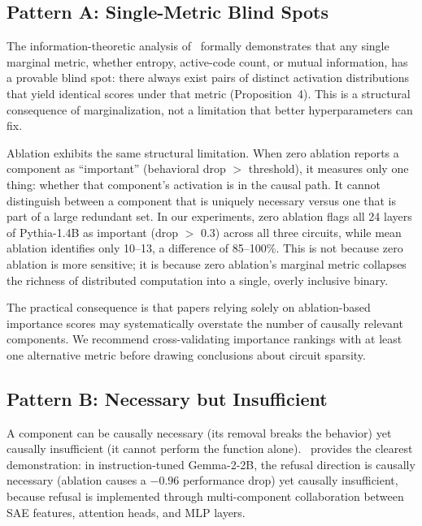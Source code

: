 \documentclass[pdflatex,sn-mathphys-num]{sn-jnl}
\begin{document}
\subsection{Pattern A: Single-Metric Blind Spots}
\label{sec:patternA}

The information-theoretic analysis of~\cite{Hayashi2026} formally demonstrates that any single marginal metric, whether entropy, active-code count, or mutual information, has a provable blind spot: there always exist pairs of distinct activation distributions that yield identical scores under that metric (Proposition~4). This is a structural consequence of marginalization, not a limitation that better hyperparameters can fix.

Ablation exhibits the same structural limitation. When zero ablation reports a component as ``important'' (behavioral drop $>$ threshold), it measures only one thing: whether that component's activation is in the causal path. It cannot distinguish between a component that is uniquely necessary versus one that is part of a large redundant set. In our experiments, zero ablation flags all 24 layers of Pythia-1.4B as important (drop $>$ 0.3) across all three circuits, while mean ablation identifies only 10--13, a difference of 85--100\%. This is not because zero ablation is more sensitive; it is because zero ablation's marginal metric collapses the richness of distributed computation into a single, overly inclusive binary.

The practical consequence is that papers relying solely on ablation-based importance scores may systematically overstate the number of causally relevant components. We recommend cross-validating importance rankings with at least one alternative metric before drawing conclusions about circuit sparsity.

\subsection{Pattern B: Necessary but Insufficient}
\label{sec:patternB}

A component can be causally necessary (its removal breaks the behavior) yet causally insufficient (it cannot perform the function alone).~\cite{Rumbelow2026} provides the clearest demonstration: in instruction-tuned Gemma-2-2B, the refusal direction is causally necessary (ablation causes a $-0.96$ performance drop) yet causally insufficient, because refusal is implemented through multi-component collaboration between SAE features, attention heads, and MLP layers.
\end{document}
